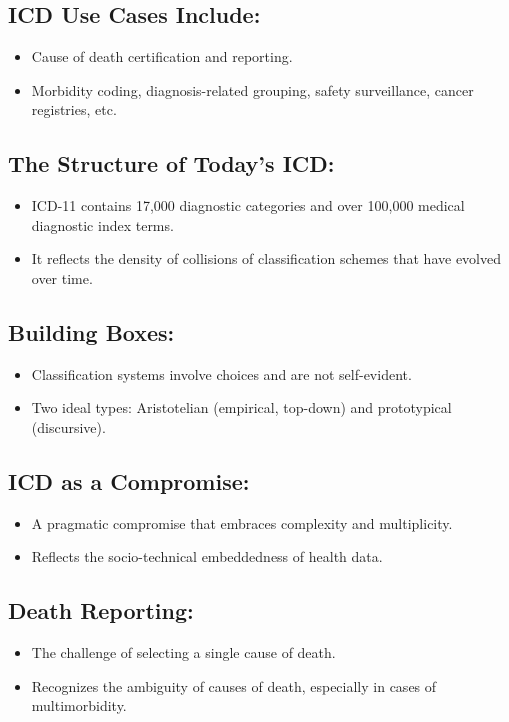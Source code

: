 \documentclass{article}
\begin{document}
\subsection*{ICD Use Cases Include:}
\begin{itemize}
  \item Cause of death certification and reporting.
  \item Morbidity coding, diagnosis-related grouping, safety surveillance, cancer registries, etc.
\end{itemize}

\subsection*{The Structure of Today's ICD:}
\begin{itemize}
  \item ICD-11 contains 17,000 diagnostic categories and over 100,000 medical diagnostic index terms.
  \item It reflects the density of collisions of classification schemes that have evolved over time.
\end{itemize}

\subsection*{Building Boxes:}
\begin{itemize}
  \item Classification systems involve choices and are not self-evident.
  \item Two ideal types: Aristotelian (empirical, top-down) and prototypical (discursive).
\end{itemize}

\subsection*{ICD as a Compromise:}
\begin{itemize}
  \item A pragmatic compromise that embraces complexity and multiplicity.
  \item Reflects the socio-technical embeddedness of health data.
\end{itemize}

\subsection*{Death Reporting:}
\begin{itemize}
  \item The challenge of selecting a single cause of death.
  \item Recognizes the ambiguity of causes of death, especially in cases of multimorbidity.
\end{itemize}
\end{document}
